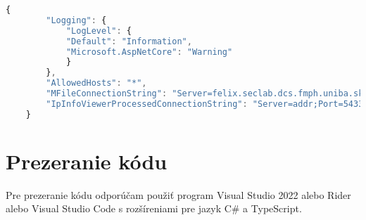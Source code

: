 \begin{lstlisting}[language={TypeScript},caption={Vzorový výstup z endpointu},label=alg:appsettings]
    {
        "Logging": {
            "LogLevel": {
            "Default": "Information",
            "Microsoft.AspNetCore": "Warning"
            }
        },
        "AllowedHosts": "*",
        "MFileConnectionString": "Server=felix.seclab.dcs.fmph.uniba.sk;Port=5432;Database=mfile;User Id=reader1;Password=****;Include Error Detail=true;",
        "IpInfoViewerProcessedConnectionString": "Server=addr;Port=5433;Database=ipinfoviewerprocesseddb;User Id=postgres;Password=0000;Include Error Detail=true"
    }
\end{lstlisting}

\section*{Prezeranie kódu}
Pre prezeranie kódu odporúčam použiť program Visual Studio 2022 alebo Rider alebo Visual Studio Code s rozšíreniami pre jazyk C\# a TypeScript.